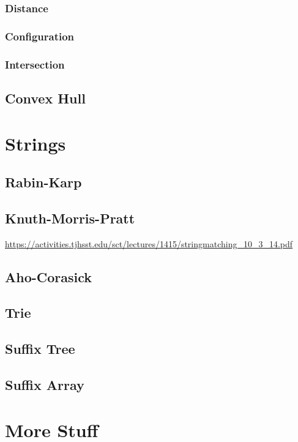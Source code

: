 \documentclass[11pt]{book}
\begin{document}
\subsection{Distance}

\subsection{Configuration}

\subsection{Intersection}

\section{Convex Hull}

\chapter{Strings}

\section{Rabin-Karp}

\section{Knuth-Morris-Pratt}

\url{https://activities.tjhsst.edu/sct/lectures/1415/stringmatching_10_3_14.pdf}

\section{Aho-Corasick}

\section{Trie}

\section{Suffix Tree}

\section{Suffix Array}

\chapter{More Stuff}
\end{document}
